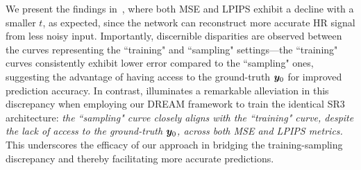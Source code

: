 We present the findings in~, where both MSE and LPIPS exhibit a decline with a smaller $t$, as expected, since the network can reconstruct more accurate HR signal from less noisy input. Importantly, discernible disparities are observed between the curves representing the ``training" and ``sampling" settings---the ``training" curves consistently exhibit lower error compared to the ``sampling" ones, suggesting the advantage of having access to the ground-truth ${\bm{y}}_0$ for improved prediction accuracy. In contrast,  illuminates a remarkable alleviation in this discrepancy when employing our DREAM framework to train the identical SR3 architecture: \emph{the ``sampling" curve closely aligns with the ``training" curve, despite the lack of access to the ground-truth ${\bm{y}}_0$, across both MSE and LPIPS metrics.} This underscores the efficacy of our approach in bridging the training-sampling discrepancy and thereby facilitating more accurate predictions.

